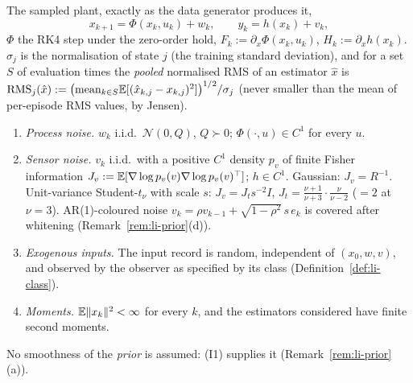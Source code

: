 The sampled plant, exactly as the data generator produces it,
\begin{equation}\label{eq:li-plant}
x_{k+1}=\Phi(x_k,u_k)+w_k,\qquad y_k=h(x_k)+v_k,
\end{equation}
$\Phi$ the RK4 step under the zero-order hold, $F_k:=\partial_x\Phi(x_k,u_k)$, $H_k:=\partial_xh(x_k)$. $\sigma_j$ is the
normalisation of state $j$ (the training standard deviation), and for a set $S$ of evaluation times the
\emph{pooled} normalised RMS of an estimator $\hat x$ is
$\mathrm{RMS}_j(\hat x):=\big(\mathrm{mean}_{k\in S}\mathbb E[(\hat x_{k,j}-x_{k,j})^2]\big)^{1/2}/\sigma_j$ (never smaller than the
mean of per-episode RMS values, by Jensen).

\begin{assumption}\label{ass:li}
\begin{enumerate}[leftmargin=2.2em]
\item[(I1)] \emph{Process noise.} $w_k$ i.i.d.\ $\mathcal N(0,Q)$, $Q\succ0$; $\Phi(\cdot,u)\in C^1$ for every $u$.
\item[(I2)] \emph{Sensor noise.} $v_k$ i.i.d.\ with a positive $C^1$ density $p_v$ of finite Fisher information
$J_v:=\mathbb E[\nabla\log p_v(v)\nabla\log p_v(v)^\top]$; $h\in C^1$. Gaussian: $J_v=R^{-1}$. Unit-variance Student-$t_\nu$ with
scale $s$: $J_v=J_t s^{-2}I$, $J_t=\frac{\nu+1}{\nu+3}\cdot\frac{\nu}{\nu-2}$ ($=2$ at $\nu=3$). AR(1)-coloured noise
$v_k=\rho v_{k-1}+\sqrt{1-\rho^2}\,s\,e_k$ is covered after whitening (Remark~\ref{rem:li-prior}(d)).
\item[(I3)] \emph{Exogenous inputs.} The input record is random, independent of $(x_0,w,v)$, and observed by the
observer as specified by its class (Definition~\ref{def:li-class}).
\item[(I4)] \emph{Moments.} $\mathbb E\|x_k\|^2<\infty$ for every $k$, and the estimators considered have finite second moments.
\end{enumerate}
\end{assumption}
\noindent No smoothness of the \emph{prior} is assumed: (I1) supplies it (Remark~\ref{rem:li-prior}(a)).

